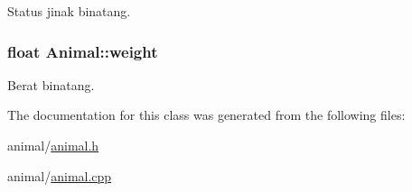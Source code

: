 Status jinak binatang. 

\subsubsection[{\texorpdfstring{weight}{weight}}]{\setlength{\rightskip}{0pt plus 5cm}float Animal\+::weight\hspace{0.3cm}{\ttfamily [protected]}}\hypertarget{classAnimal_a055c4df7dacb89eb4c2ca9bbee11ff24}{}\label{classAnimal_a055c4df7dacb89eb4c2ca9bbee11ff24}


Berat binatang. 



The documentation for this class was generated from the following files\+:\begin{DoxyCompactItemize}
\item 
animal/\hyperlink{animal_8h}{animal.\+h}\item 
animal/\hyperlink{animal_8cpp}{animal.\+cpp}\end{DoxyCompactItemize}
